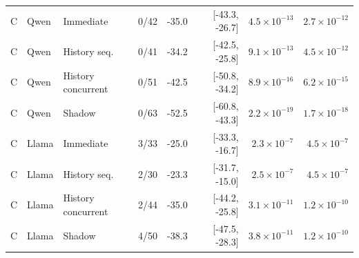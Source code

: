 \begin{table}[t]
\begin{tabularx}{\textwidth}{@{}llYrrrrr@{}}
\midrule
C & Qwen & Immediate & 0/42 & -35.0 & [-43.3, -26.7] & $4.5\times10^{-13}$ & $2.7\times10^{-12}$ \\
C & Qwen & History seq. & 0/41 & -34.2 & [-42.5, -25.8] & $9.1\times10^{-13}$ & $4.5\times10^{-12}$ \\
C & Qwen & History concurrent & 0/51 & -42.5 & [-50.8, -34.2] & $8.9\times10^{-16}$ & $6.2\times10^{-15}$ \\
C & Qwen & Shadow & 0/63 & -52.5 & [-60.8, -43.3] & $2.2\times10^{-19}$ & $1.7\times10^{-18}$ \\
C & Llama & Immediate & 3/33 & -25.0 & [-33.3, -16.7] & $2.3\times10^{-7}$ & $4.5\times10^{-7}$ \\
C & Llama & History seq. & 2/30 & -23.3 & [-31.7, -15.0] & $2.5\times10^{-7}$ & $4.5\times10^{-7}$ \\
C & Llama & History concurrent & 2/44 & -35.0 & [-44.2, -25.8] & $3.1\times10^{-11}$ & $1.2\times10^{-10}$ \\
C & Llama & Shadow & 4/50 & -38.3 & [-47.5, -28.3] & $3.8\times10^{-11}$ & $1.2\times10^{-10}$ \\
\bottomrule\end{tabularx}
\end{table}
